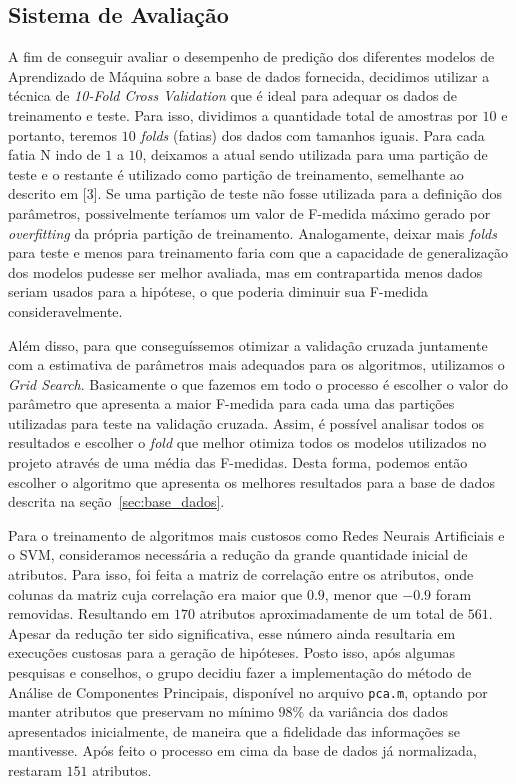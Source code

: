 \documentclass[10pt, conference, compsocconf]{IEEEtran}
\begin{document}
\subsection{Sistema de Avaliação}\label{subsec:sistema_avaliacao}
A fim de conseguir avaliar o desempenho de predição dos diferentes modelos 
de Aprendizado de Máquina sobre a base de dados fornecida, decidimos utilizar 
a técnica de \textsl{10-Fold Cross Validation} que é ideal para adequar os 
dados de treinamento e teste. Para isso, dividimos a quantidade total de 
amostras por $10$ e portanto, teremos $10$ \textsl{folds} (fatias) dos dados 
com tamanhos iguais. Para cada fatia N indo de $1$ a $10$, deixamos a atual 
sendo utilizada para uma partição de teste e o restante é utilizado como partição 
de treinamento, semelhante ao descrito em [3]. Se uma partição de 
teste não fosse utilizada para a definição dos parâmetros, possivelmente 
teríamos um valor de F-medida máximo gerado por \textsl{overfitting} da própria 
partição de treinamento. Analogamente, deixar mais \textsl{folds} para teste e
menos para treinamento faria com que a capacidade de generalização dos modelos
pudesse ser melhor avaliada, mas em contrapartida menos dados seriam usados para
a hipótese, o que poderia diminuir sua F-medida consideravelmente.


Além disso, para que conseguíssemos otimizar a validação cruzada juntamente 
com a estimativa de parâmetros mais adequados para os algoritmos, utilizamos 
o \textsl{Grid Search}. Basicamente o que fazemos em todo o processo é escolher 
o valor do parâmetro que apresenta a maior F-medida para cada uma das partições 
utilizadas para teste na validação cruzada. Assim, é possível analisar todos os
resultados e escolher o \textsl{fold} que melhor otimiza todos os modelos 
utilizados no projeto através de uma média das F-medidas. Desta forma, podemos
então escolher o algoritmo que apresenta os melhores resultados para a base de
dados descrita na seção~\ref{sec:base_dados}.

Para o treinamento de algoritmos mais custosos como Redes Neurais Artificiais 
e o SVM, consideramos necessária a redução da grande quantidade inicial de 
atributos. Para isso, foi feita a matriz de correlação entre os atributos, onde
colunas da matriz cuja correlação era maior que $0.9$, menor que $-0.9$ foram 
removidas. Resultando em $170$ atributos aproximadamente de um total de $561$. 
Apesar da redução ter sido significativa, esse número ainda resultaria em 
execuções custosas para a geração de hipóteses. Posto isso, após algumas 
pesquisas e conselhos, o grupo decidiu fazer a implementação do método de 
Análise de Componentes Principais, disponível no arquivo \texttt{pca.m}, optando por manter atributos que preservam 
no mínimo $98\%$ da variância dos dados apresentados inicialmente, de maneira 
que a fidelidade das informações se mantivesse. Após feito o processo em cima 
da base de dados já normalizada, restaram $151$ atributos.
\end{document}
